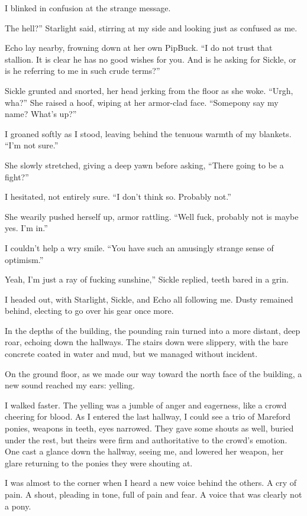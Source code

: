 I blinked in confusion at the strange message.

\leavevmode{}The hell?” Starlight said, stirring at my side and looking just as confused as me.

Echo lay nearby, frowning down at her own PipBuck. “I do not trust that stallion. It is clear he has no good wishes for you. And is he asking for Sickle, or is he referring to me in such crude terms?”

Sickle grunted and snorted, her head jerking from the floor as she woke. “Urgh, wha?” She raised a hoof, wiping at her armor-clad face. “Somepony say my name? What’s up?”

I groaned softly as I stood, leaving behind the tenuous warmth of my blankets. “I’m not sure.”

She slowly stretched, giving a deep yawn before asking, “There going to be a fight?”

I hesitated, not entirely sure. “I don’t think so. Probably not.”

She wearily pushed herself up, armor rattling. “Well fuck, probably not is maybe yes. I’m in.”

I couldn’t help a wry smile. “You have such an amusingly strange sense of optimism.”

\leavevmode{}Yeah, I’m just a ray of fucking sunshine,” Sickle replied, teeth bared in a grin.

I headed out, with Starlight, Sickle, and Echo all following me. Dusty remained behind, electing to go over his gear once more.

In the depths of the building, the pounding rain turned into a more distant, deep roar, echoing down the hallways. The stairs down were slippery, with the bare concrete coated in water and mud, but we managed without incident.

On the ground floor, as we made our way toward the north face of the building, a new sound reached my ears: yelling.

I walked faster. The yelling was a jumble of anger and eagerness, like a crowd cheering for blood. As I entered the last hallway, I could see a trio of Mareford ponies, weapons in teeth, eyes narrowed. They gave some shouts as well, buried under the rest, but theirs were firm and authoritative to the crowd’s emotion. One cast a glance down the hallway, seeing me, and lowered her weapon, her glare returning to the ponies they were shouting at.

I was almost to the corner when I heard a new voice behind the others. A cry of pain. A shout, pleading in tone, full of pain and fear. A voice that was clearly not a pony.

